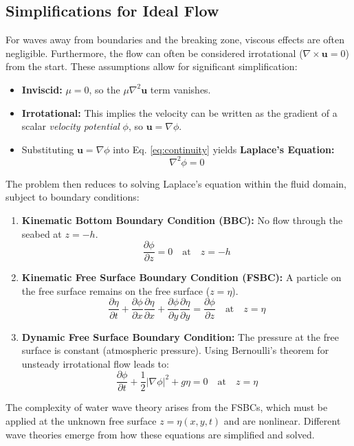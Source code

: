 \documentclass[11pt,letterpaper]{article}
\begin{document}
\subsection{Simplifications for Ideal Flow}
For waves away from boundaries and the breaking zone, viscous effects are often negligible. Furthermore, the flow can often be considered irrotational ($\nabla \times \mathbf{u} = 0$) from the start. These assumptions allow for significant simplification:
\begin{itemize}
    \item \textbf{Inviscid:} $\mu = 0$, so the $\mu \nabla^2 \mathbf{u}$ term vanishes.
    \item \textbf{Irrotational:} This implies the velocity can be written as the gradient of a scalar \emph{velocity potential} $\phi$, so $\mathbf{u} = \nabla \phi$.
    \item Substituting $\mathbf{u} = \nabla \phi$ into Eq. \ref{eq:continuity} yields \textbf{Laplace's Equation:}
        \begin{equation}
        \nabla^2 \phi = 0
        \label{eq:laplace}
        \end{equation}
\end{itemize}
The problem then reduces to solving Laplace's equation within the fluid domain, subject to boundary conditions:
\begin{enumerate}
    \item \textbf{Kinematic Bottom Boundary Condition (BBC):} No flow through the seabed at $z = -h$.
        \begin{equation}
        \frac{\partial \phi}{\partial z} = 0 \quad \text{at} \quad z = -h
        \end{equation}
    \item \textbf{Kinematic Free Surface Boundary Condition (FSBC):} A particle on the free surface remains on the free surface ($z = \eta$).
        \begin{equation}
        \frac{\partial \eta}{\partial t} + \frac{\partial \phi}{\partial x}\frac{\partial \eta}{\partial x} + \frac{\partial \phi}{\partial y}\frac{\partial \eta}{\partial y} = \frac{\partial \phi}{\partial z} \quad \text{at} \quad z = \eta
        \end{equation}
    \item \textbf{Dynamic Free Surface Boundary Condition:} The pressure at the free surface is constant (atmospheric pressure). Using Bernoulli's theorem for unsteady irrotational flow leads to:
        \begin{equation}
        \frac{\partial \phi}{\partial t} + \frac{1}{2}|\nabla \phi|^2 + g\eta = 0 \quad \text{at} \quad z = \eta
        \end{equation}
\end{enumerate}
The complexity of water wave theory arises from the FSBCs, which must be applied at the unknown free surface $z=\eta(x,y,t)$ and are nonlinear. Different wave theories emerge from how these equations are simplified and solved.
\end{document}
